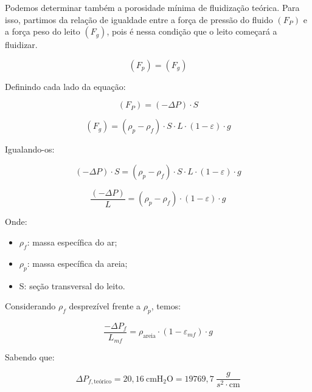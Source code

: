 Podemos determinar também a porosidade mínima de fluidização teórica. Para isso, partimos da relação de igualdade entre a força de pressão do fluido $ (F_P) $ e a força peso do leito $ (F_g) $, pois é nessa condição que o leito começará a fluidizar.

\begin{equation}\label{key}
\left(F_{p}\right)=\left(F_{g}\right)
\end{equation}

Definindo cada lado da equação:

\begin{equation}\label{key}
\left(F_{P}\right)=(-\Delta P) \cdot S
\end{equation}

\begin{equation}\label{key}
\left(F_{g}\right)=\left(\rho_{p}-\rho_{f}\right) \cdot S \cdot L \cdot(1-\varepsilon) \cdot g
\end{equation}

Igualando-os:

\begin{equation}\label{key}
(-\Delta P) \cdot S=\left(\rho_{p}-\rho_{f}\right) \cdot S \cdot L \cdot(1-\varepsilon) \cdot g
\end{equation}

\begin{equation}\label{key}
\frac{(-\Delta P)}{L}=\left(\rho_{p}-\rho_{f}\right) \cdot(1-\varepsilon) \cdot g
\end{equation}


Onde:

\begin{itemize}
\item $ \rho_f $: massa específica do ar;
\item $ \rho_p $: massa específica da areia;
\item S: seção transversal do leito.
\end{itemize}

\newpage

Considerando $ \rho_f $ desprezível frente a $ \rho_p $, temos:

\begin{equation}\label{key}
\frac{-\Delta P_{f}}{L_{m f}}=\rho_{\text {areia}} \cdot\left(1-\varepsilon_{m f}\right) \cdot g
\end{equation}

Sabendo que:

\begin{equation}\label{key}
\Delta P_{f, \text{teórico}}=20,16 \ \mathrm{cm} \mathrm{H_{2}O} = 19769,7 \ \frac{g}{s^{2} \cdot \mathrm{cm}}
\end{equation}


